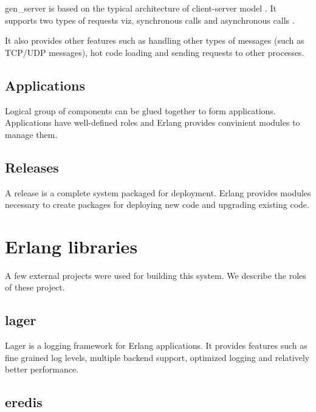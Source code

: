 gen\_server is based on the typical architecture of client-server model
\citep{reliable.dist.sys}. It supports two types of requests viz, synchronous
calls%
and asynchronous calls%
.

It also provides other features such as handling other types of messages (such
as TCP/UDP messages), hot code loading and sending requests to other
processes.

\subsection{Applications}
\label{section:concepts.applications}
Logical group of components can be glued together to form applications.
Applications have well-defined roles and Erlang provides convinient modules to
manage them.

\subsection{Releases}
\label{section:concepts.releases}
A release is a complete system packaged for deployment. Erlang provides modules
necessary to create packages for deploying new code and upgrading existing code.

\section{Erlang libraries}

A few external projects were used for building this system. We describe the
roles of these project.

\subsection{lager}

Lager \citep{lager} is a logging framework for Erlang applications. It provides
features such as fine grained log levels, multiple backend support, optimized
logging and relatively better performance.

\subsection{eredis}

